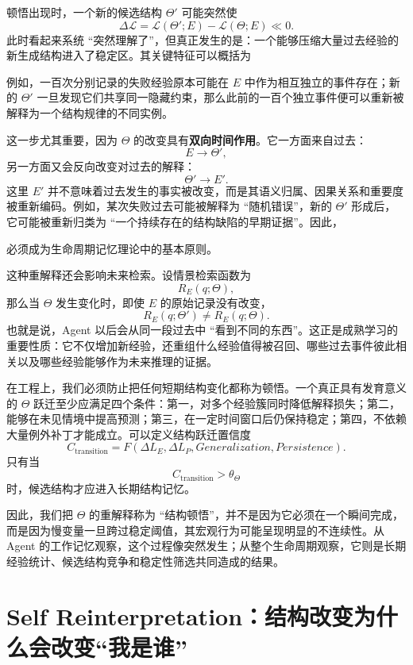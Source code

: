 顿悟出现时，一个新的候选结构 $\Theta'$ 可能突然使
\[
\Delta\mathcal L
=
\mathcal L(\Theta';E)
-
\mathcal L(\Theta;E)
\ll 0.
\]
此时看起来系统 ``突然理解了''，但真正发生的是：一个能够压缩大量过去经验的新生成结构进入了稳定区。其关键特征可以概括为
\begin{statementbox}
\centering
{}
\end{statementbox}
例如，一百次分别记录的失败经验原本可能在 $E$ 中作为相互独立的事件存在；新的 $\Theta'$ 一旦发现它们共享同一隐藏约束，那么此前的一百个独立事件便可以重新被解释为一个结构规律的不同实例。

这一步尤其重要，因为 $\Theta$ 的改变具有\textbf{双向时间作用}。它一方面来自过去：
\[
E\rightarrow\Theta',
\]
另一方面又会反向改变对过去的解释：
\[
\Theta'\rightarrow E'.
\]
这里 $E'$ 并不意味着过去发生的事实被改变，而是其语义归属、因果关系和重要度被重新编码。例如，某次失败过去可能被解释为 ``随机错误''，新的 $\Theta'$ 形成后，它可能被重新归类为 ``一个持续存在的结构缺陷的早期证据''。因此，
\begin{statementbox}
\centering
{}
\end{statementbox}
必须成为生命周期记忆理论中的基本原则。

这种重解释还会影响未来检索。设情景检索函数为
\[
R_E(q;\Theta),
\]
那么当 $\Theta$ 发生变化时，即使 $E$ 的原始记录没有改变，
\[
R_E(q;\Theta')
\neq
R_E(q;\Theta).
\]
也就是说，Agent 以后会从同一段过去中 ``看到不同的东西''。这正是成熟学习的重要性质：它不仅增加新经验，还重组什么经验值得被召回、哪些过去事件彼此相关以及哪些经验能够作为未来推理的证据。

在工程上，我们必须防止把任何短期结构变化都称为顿悟。一个真正具有发育意义的 $\Theta$ 跃迁至少应满足四个条件：第一，对多个经验簇同时降低解释损失；第二，能够在未见情境中提高预测；第三，在一定时间窗口后仍保持稳定；第四，不依赖大量例外补丁才能成立。可以定义结构跃迁置信度
\[
C_{\mathrm{transition}}
=
F(
\Delta L_E,
\Delta L_P,
Generalization,
Persistence
).
\]
只有当
\[
C_{\mathrm{transition}}>\theta_{\Theta}
\]
时，候选结构才应进入长期结构记忆。

因此，我们把 $\Theta$ 的重解释称为 ``结构顿悟''，并不是因为它必须在一个瞬间完成，而是因为慢变量一旦跨过稳定阈值，其宏观行为可能呈现明显的不连续性。从 Agent 的工作记忆观察，这个过程像突然发生；从整个生命周期观察，它则是长期经验统计、候选结构竞争和稳定性筛选共同造成的结果。

\section{Self Reinterpretation：结构改变为什么会改变“我是谁”}

